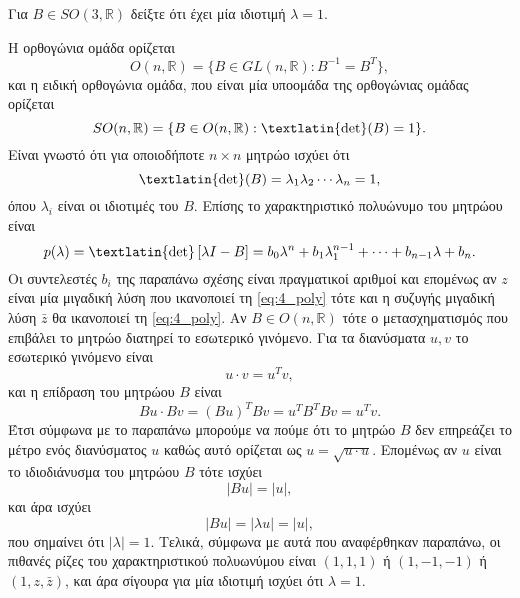 \documentclass[a4paper,11pt]{article}
\newcommand{\tl}[1]{\textlatin{#1}}
\newenvironment{exercise}[2][Άσκηση]
{\begin{trivlist}
    \item[\hskip \labelsep {\bfseries #1}\hskip \labelsep {\bfseries #2.}]}
{\end{trivlist}}
\newenvironment{solution}[2][Λύση]
{\begin{trivlist}
    \item[\hskip \labelsep {\bfseries #1}\hskip \labelsep {\bfseries #2.}]}
{\end{trivlist}}
\begin{document}
\begin{exercise}{4}
    Για $B \in SO(3, \mathbb{R})$ δείξτε ότι έχει μία ιδιοτιμή $\lambda = 1$.
\end{exercise}
\begin{solution}{4}
    Η ορθογώνια ομάδα ορίζεται
    \begin{equation*}
        O(n, \mathbb{R}) = \{B \in GL(n, \mathbb{R}) : B^{-1} = B^T \},
    \end{equation*}
    και η ειδική ορθογώνια ομάδα, που είναι μία υποομάδα της ορθογώνιας ομάδας ορίζεται
    \begin{equation*}
        SO(n, \mathbb{R}) = \{B \in O(n, \mathbb{R}) : \text{\tl{det}}(B) = 1 \}.
    \end{equation*}
    Είναι γνωστό ότι για οποιοδήποτε $n \times n$ μητρώο ισχύει ότι
    \begin{equation*}
        \text{\tl{det}}(B) = \lambda_1 \lambda_2 \cdots \lambda_n = 1,
    \end{equation*}
    όπου $\lambda_i$ είναι οι ιδιοτιμές του $B$. Επίσης το χαρακτηριστικό
    πολυώνυμο του μητρώου είναι
    \begin{equation}\label{eq:4_poly}
        p(\lambda) = \text{\tl{det}}\left[ \lambda I - B \right] = b_0 \lambda^n +
        b_1 \lambda_1^{n-1} + \dots + b_{n-1}\lambda + b_n.
    \end{equation}
    Οι συντελεστές $b_i$ της παραπάνω σχέσης είναι πραγματικοί αριθμοί και
    επομένως αν $z$ είναι μία μιγαδική λύση που ικανοποιεί τη \eqref{eq:4_poly}
    τότε και η συζυγής μιγαδική λύση $\bar{z}$ θα ικανοποιεί τη
    \eqref{eq:4_poly}. Αν $B \in O(n, \mathbb{R})$ τότε ο μετασχηματισμός που
    επιβάλει το μητρώο διατηρεί το εσωτερικό γινόμενο. Για τα διανύσματα
    $u, v$ το εσωτερικό γινόμενο είναι
    \begin{equation*}
        u \cdot v = u^Tv,
    \end{equation*}
    και η επίδραση του μητρώου $B$ είναι
    \begin{equation*}
        Bu \cdot Bv = (Bu)^T Bv = u^T B^T Bv = u^Tv.
    \end{equation*}
    Έτσι σύμφωνα με το παραπάνω μπορούμε να πούμε ότι το μητρώο $B$ δεν
    επηρεάζει το μέτρο ενός διανύσματος $u$ καθώς αυτό ορίζεται ως
    $u = \sqrt{u \cdot u}$. Επομένως αν $u$ είναι το
    ιδιοδιάνυσμα του μητρώου $B$ τότε ισχύει
    \begin{equation*}
        \left|B u \right| = \left|u \right|,
    \end{equation*}
    και άρα ισχύει
    \begin{equation*}
        \left|B u \right| = \left|\lambda u \right| = \left| u \right|,
    \end{equation*}
    που σημαίνει ότι $| \lambda | = 1$. Τελικά, σύμφωνα με αυτά που
    αναφέρθηκαν παραπάνω, οι πιθανές ρίζες του χαρακτηριστικού πολυωνύμου είναι
    $(1, 1, 1)$ ή $(1, -1, -1)$ ή $(1, z, \bar{z})$, και άρα σίγουρα για μία
    ιδιοτιμή ισχύει ότι $\lambda = 1$.
\end{solution}
\end{document}
